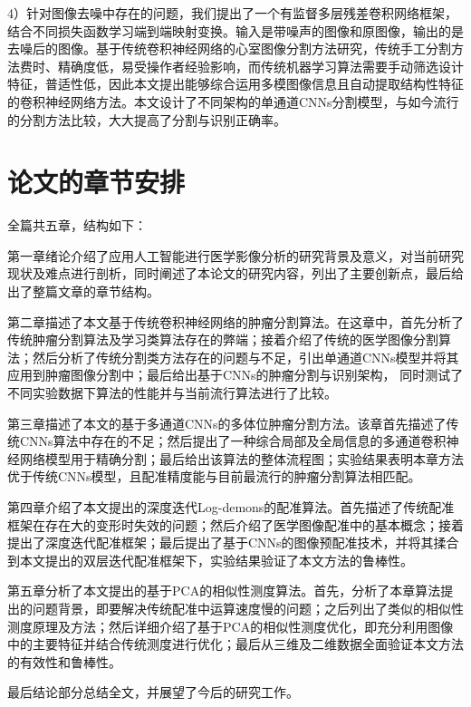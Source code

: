 4）针对图像去噪中存在的问题，我们提出了一个有监督多层残差卷积网络框架，结合不同损失函数学习端到端映射变换。输入是带噪声的图像和原图像，输出的是去噪后的图像。基于传统卷积神经网络的心室图像分割方法研究，传统手工分割方法费时、精确度低，易受操作者经验影响，而传统机器学习算法需要手动筛选设计特征，普适性低，因此本文提出能够综合运用多模图像信息且自动提取结构性特征的卷积神经网络方法。本文设计了不同架构的单通道CNNs分割模型，与如今流行的分割方法比较，大大提高了分割与识别正确率。 

\section{论文的章节安排}

全篇共五章，结构如下：

第一章绪论介绍了应用人工智能进行医学影像分析的研究背景及意义，对当前研究现状及难点进行剖析，同时阐述了本论文的研究内容，列出了主要创新点，最后给出了整篇文章的章节结构。

第二章描述了本文基于传统卷积神经网络的肿瘤分割算法。在这章中，首先分析了传统肿瘤分割算法及学习类算法存在的弊端；接着介绍了传统的医学图像分割算法；然后分析了传统分割类方法存在的问题与不足，引出单通道CNNs模型并将其应用到肿瘤图像分割中；最后给出基于CNNs的肿瘤分割与识别架构，
同时测试了不同实验数据下算法的性能并与当前流行算法进行了比较。

第三章描述了本文的基于多通道CNNs的多体位肿瘤分割方法。该章首先描述了传统CNNs算法中存在的不足；然后提出了一种综合局部及全局信息的多通道卷积神经网络模型用于精确分割；最后给出该算法的整体流程图；实验结果表明本章方法优于传统CNNs模型，且配准精度能与目前最流行的肿瘤分割算法相匹配。

第四章介绍了本文提出的深度迭代Log-demons的配准算法。首先描述了传统配准框架在存在大的变形时失效的问题；然后介绍了医学图像配准中的基本概念；接着提出了深度迭代配准框架；最后提出了基于CNNs的图像预配准技术，并将其揉合到本文提出的双层迭代配准框架下，实验结果验证了本文方法的鲁棒性。 

第五章分析了本文提出的基于PCA的相似性测度算法。首先，分析了本章算法提出的问题背景，即要解决传统配准中运算速度慢的问题；之后列出了类似的相似性测度原理及方法；然后详细介绍了基于PCA的相似性测度优化，即充分利用图像中的主要特征并结合传统测度进行优化；最后从三维及二维数据全面验证本文方法的有效性和鲁棒性。

最后结论部分总结全文，并展望了今后的研究工作。